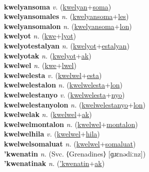  \label{kwelyanak} \\
\textbf{kwelyansoma} \textit{v.} (\hyperref[kwelyan]{kwelyan}+\hyperref[soma]{soma})
 \label{kwelyansoma} \\
\textbf{kwelyansomales} \textit{n.} (\hyperref[kwelyansoma]{kwelyansoma}+\hyperref[les]{les})
 \label{kwelyansomales} \\
\textbf{kwelyansomalon} \textit{n.} (\hyperref[kwelyansoma]{kwelyansoma}+\hyperref[lon]{lon})
 \label{kwelyansomalon} \\
\textbf{kwelyot} \textit{n.} (\hyperref[kwe]{kwe}+\hyperref[lyot]{lyot})
 \label{kwelyot} \\
\textbf{kwelyotestalyan} \textit{n.} (\hyperref[kwelyot]{kwelyot}+\hyperref[estalyan]{estalyan})
 \label{kwelyotestalyan} \\
\textbf{kwelyotak} \textit{n.} (\hyperref[kwelyot]{kwelyot}+\hyperref[ak]{ak})
 \label{kwelyotak} \\
\textbf{kwelwel} \textit{n.} (\hyperref[kwe]{kwe}+\hyperref[lwel]{lwel})
 \label{kwelwel} \\
\textbf{kwelwelesta} \textit{v.} (\hyperref[kwelwel]{kwelwel}+\hyperref[esta]{esta})
 \label{kwelwelesta} \\
\textbf{kwelwelestalon} \textit{n.} (\hyperref[kwelwelesta]{kwelwelesta}+\hyperref[lon]{lon})
 \label{kwelwelestalon} \\
\textbf{kwelwelestanyo} \textit{v.} (\hyperref[kwelwelesta]{kwelwelesta}+\hyperref[nyo]{nyo})
 \label{kwelwelestanyo} \\
\textbf{kwelwelestanyolon} \textit{n.} (\hyperref[kwelwelestanyo]{kwelwelestanyo}+\hyperref[lon]{lon})
 \label{kwelwelestanyolon} \\
\textbf{kwelwelak} \textit{n.} (\hyperref[kwelwel]{kwelwel}+\hyperref[ak]{ak})
 \label{kwelwelak} \\
\textbf{kwelwelmontalon} \textit{n.} (\hyperref[kwelwel]{kwelwel}+\hyperref[montalon]{montalon})
 \label{kwelwelmontalon} \\
\textbf{kwelwelhila} \textit{v.} (\hyperref[kwelwel]{kwelwel}+\hyperref[hila]{hila})
 \label{kwelwelhila} \\
\textbf{kwelwelsomaluat} \textit{n.} (\hyperref[kwelwel]{kwelwel}+\hyperref[somaluat]{somaluat})
 \label{kwelwelsomaluat} \\
\textbf{'kwenatin} \textit{n.} (Svc. ⟨Grenadines⟩ [ɡɹɛnədiːnz])
 \label{'kwenatin} \\
\textbf{'kwenatinak} \textit{n.} (\hyperref['kwenatin]{'kwenatin}+\hyperref[ak]{ak})
 \label{'kwenatinak} \\
